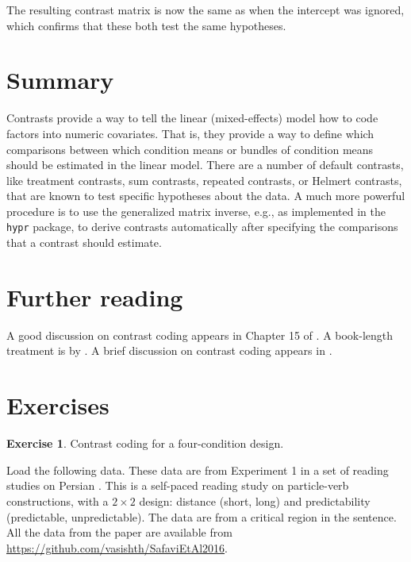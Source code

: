\documentclass[
  12pt,
]{krantz}
\theoremstyle{definition}
\theoremstyle{definition}
\theoremstyle{definition}
\newtheorem{exercise}{Exercise}[chapter]
\theoremstyle{definition}
\theoremstyle{remark}
\begin{document}
The resulting contrast matrix is now the same as when the intercept was ignored, which confirms that these both test the same hypotheses.

\hypertarget{summary-5}{%
\section{Summary}\label{summary-5}}

Contrasts provide a way to tell the linear (mixed-effects) model how to code factors into numeric covariates. That is, they provide a way to define which comparisons between which condition means or bundles of condition means should be estimated in the linear model. There are a number of default contrasts, like treatment contrasts, sum contrasts, repeated contrasts, or Helmert contrasts, that are known to test specific hypotheses about the data. A much more powerful procedure is to use the generalized matrix inverse, e.g., as implemented in the \texttt{hypr} package, to derive contrasts automatically after specifying the comparisons that a contrast should estimate.

\hypertarget{further-reading-4}{%
\section{Further reading}\label{further-reading-4}}

A good discussion on contrast coding appears in Chapter 15 of \citet{baguley2012serious}. A book-length treatment is by \citet{rosenthal2000contrasts}. A brief discussion on contrast coding appears in \citet{venablesripley}.

\hypertarget{sec:Contrastsexercises}{%
\section{Exercises}\label{sec:Contrastsexercises}}

\begin{exercise}
\protect\hypertarget{exr:ContrastsPersian}{}\label{exr:ContrastsPersian}Contrast coding for a four-condition design.
\end{exercise}

Load the following data. These data are from Experiment 1 in a set of reading studies on Persian \citep{SafaviEtAlFrontiers2016}. This is a self-paced reading study on particle-verb constructions, with a \(2\times 2\) design: distance (short, long) and predictability (predictable, unpredictable). The data are from a critical region in the sentence. All the data from the \citet{SafaviEtAlFrontiers2016} paper are available from \url{https://github.com/vasishth/SafaviEtAl2016}.
\end{document}

